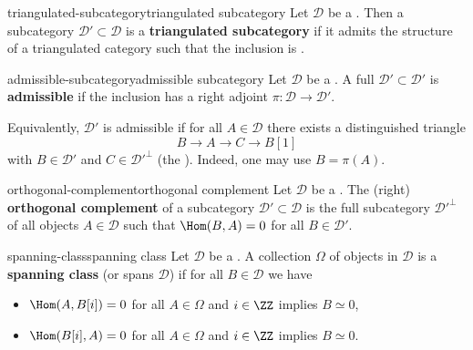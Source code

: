 \begin{topic}{triangulated-subcategory}{triangulated subcategory}
    Let $\mathcal{D}$ be a . Then a subcategory $\mathcal{D}' \subset \mathcal{D}$ is a \textbf{triangulated subcategory} if it admits the structure of a triangulated category such that the inclusion is .
\end{topic}

\begin{topic}{admissible-subcategory}{admissible subcategory}
    Let $\mathcal{D}$ be a . A full  $\mathcal{D}' \subset \mathcal{D}'$ is \textbf{admissible} if the inclusion has a right adjoint $\pi : \mathcal{D} \to \mathcal{D}'$.
    
    Equivalently, $\mathcal{D}'$ is admissible if for all $A \in \mathcal{D}$ there exists a distinguished triangle
    \[ B \to A \to C \to B[1] \]
    with $B \in \mathcal{D}'$ and $C \in {\mathcal{D}'}^\perp$ (the ). Indeed, one may use $B = \pi(A)$.
\end{topic}

\begin{topic}{orthogonal-complement}{orthogonal complement}
    Let $\mathcal{D}$ be a . The (right) \textbf{orthogonal complement} of a subcategory $\mathcal{D}' \subset \mathcal{D}$ is the full subcategory ${\mathcal{D}'}^\perp$ of all objects $A \in \mathcal{D}$ such that $\Hom(B, A) = 0$ for all $B \in \mathcal{D}'$.
\end{topic}

\begin{topic}{spanning-class}{spanning class}
    Let $\mathcal{D}$ be a . A collection $\Omega$ of objects in $\mathcal{D}$ is a \textbf{spanning class} (or spans $\mathcal{D}$) if for all $B \in \mathcal{D}$ we have
    \begin{itemize}
        \item $\Hom(A, B[i]) = 0$ for all $A \in \Omega$ and $i \in \ZZ$ implies $B \simeq 0$,
        \item $\Hom(B[i], A) = 0$ for all $A \in \Omega$ and $i \in \ZZ$ implies $B \simeq 0$.
    \end{itemize}
\end{topic}

